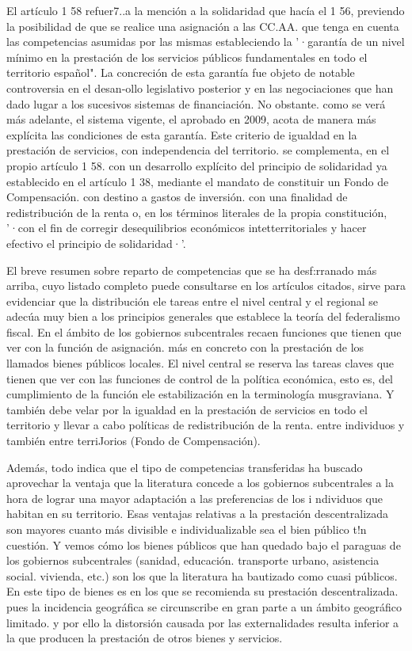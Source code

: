 \documentclass[10pt,a4paper]{article}
\begin{document}
El artículo 1 58 refuer7..a la mención a la solidaridad que hacía el 1 56, previendo la posibilidad de que se realice una asignación a las CC.AA. que tenga en cuenta las competencias asumidas por las mismas estableciendo la '·garantía de un nivel mínimo en la prestación de los servicios públicos fundamentales en todo el territorio español". La concreción de esta garantía fue objeto de notable controversia en el desan-ollo legislativo posterior y en las negociaciones que han dado lugar a los sucesivos sistemas de financiación. No obstante. como se verá más adelante, el sistema vigente, el aprobado en 2009, acota de manera más explícita las condiciones de esta garantía. Este criterio de igualdad en la prestación de servicios, con independencia del territorio. se complementa, en el propio artículo 1 58. con un desarrollo explícito del principio de solidaridad ya establecido en el artículo 1 38, mediante el mandato de constituir un Fondo de Compensación. con destino a gastos de inversión. con una finalidad de redistribución de la renta o, en los términos literales de la propia constitución, '·con el fin de corregir desequilibrios económicos intetterritoriales y hacer efectivo el principio de solidaridad·'.

El breve resumen sobre reparto de competencias que se ha desf:rranado más arriba, cuyo listado completo puede consultarse en los artículos citados, sirve para evidenciar que la distribución ele tareas entre el nivel central y el regional se adecúa muy bien a los principios generales que establece la teoría del federalismo fiscal. En el ámbito de los gobiernos subcentrales recaen funciones que tienen que ver con la función de asignación. más en concreto con la prestación de los llamados bienes públicos locales. El nivel central se reserva las tareas claves que tienen que ver con las funciones de control de la política económica, esto es, del cumplimiento de la función ele estabilización en la terminología musgraviana. Y también debe velar por la igualdad en la prestación de servicios en todo el territorio y llevar a cabo políticas de redistribución de la renta. entre individuos y también entre terriJorios (Fondo de Compensación).

Además, todo indica que el tipo de competencias transferidas ha buscado aprovechar la ventaja que la literatura concede a los gobiernos subcentrales a la hora de lograr una mayor adaptación a las preferencias de los i ndividuos que habitan en su territorio. Esas ventajas relativas a la prestación descentralizada son mayores cuanto más divisible e individualizable sea el bien público t!n cuestión. Y vemos cómo los bienes públicos que han quedado bajo el paraguas de los gobiernos subcentrales (sanidad, educación. transporte urbano, asistencia social. vivienda, etc.) son los que la literatura ha bautizado como cuasi públicos. En este tipo de bienes es en los que se recomienda su prestación descentralizada. pues la incidencia geográfica se circunscribe en gran parte a un ámbito geográfico limitado. y por ello la distorsión causada por las externalidades resulta inferior a la que producen la prestación de otros bienes y servicios. 
\end{document}
